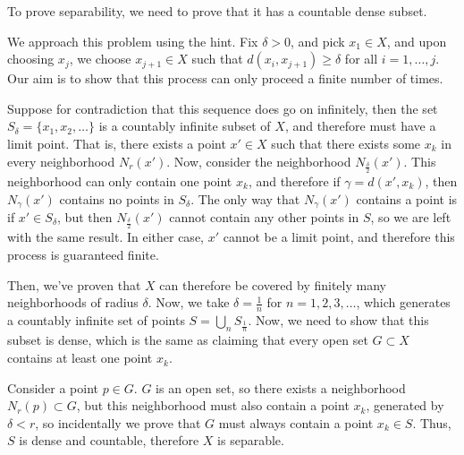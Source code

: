 \documentclass[10pt]{article}
\begin{document}
	\begin{solution}
		To prove separability, we need to prove that it has a countable dense subset. 

		We approach this problem using the hint. Fix \( \delta > 0 \), and pick \( x_1 \in X \), and 
		upon choosing \( x_j \), we choose \( x_{j + 1} \in X \) such that \( d(x_i, x_{j + 1}) \ge \delta \) for all 
		\( i = 1, \dots, j \). Our aim is to show that this process can only proceed a finite number of times. 

		Suppose for contradiction that this sequence does go on infinitely, then the set
		\( S_\delta = \{x_1, x_2, \dots \}  \) is a countably infinite subset of \( X \), 
		and therefore must have a limit point. 
		That is, there exists a point \( x' \in X \) such that there exists some \( x_k \) in every 
		neighborhood \( N_r(x') \). Now, consider the neighborhood \( N_{\frac{\delta}{2}}(x') \). This neighborhood 
		can only contain one point \( x_k \), and therefore if \( \gamma = d(x', x_k) \), then 
		\( N_{\gamma}(x') \) contains no points in \( S_\delta \). The only way that \( N_{\gamma}(x') \) contains 
		a point is if \( x' \in S_\delta \), but then \( N_{\frac{\delta}{2}}(x') \) cannot contain any other 
		points in \( S \), so we are left with the same result. In either case, \( x' \) cannot be a limit 
		point, and therefore this process is guaranteed finite. 

		Then, we've proven that \( X \) can therefore be covered by finitely many neighborhoods of 
		radius \( \delta \). Now, we take \( \delta = \frac{1}{n} \) for \( n = 1, 2, 3, \dots \), which generates 
		a countably infinite set of points \( S = \bigcup_n S_{\frac{1}{n}} \). 
		Now, we need to show that this subset is dense, which is 
		the same as claiming that every open set \( G \subset X \) contains at least one point \( x_k \). 

		Consider a point \( p \in G \). \( G \) is an open set, so there exists a neighborhood \( N_r(p) \subset G \), 
		but this neighborhood must also contain a point \( x_k \), generated by \( \delta < r \), so 
		incidentally we prove that \( G \) must always contain a point \( x_k \in S\). Thus, 
		\( S \) is dense and countable, therefore \( X \) is separable. 

	\end{solution}
\end{document}
